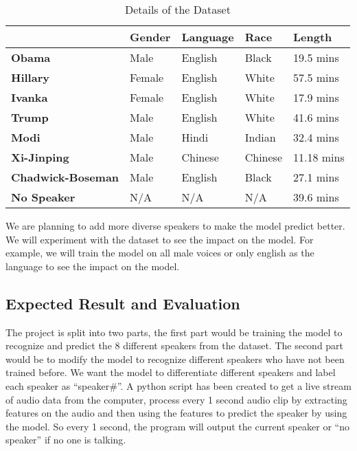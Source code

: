 \documentclass[10pt,twocolumn,letterpaper]{article}
\begin{document}
\begin{table}[h]
    \begin{tabular}{l|l|l|l|l|}
    \cline{2-5}
                                                    & \textbf{Gender} & \textbf{Language} & \textbf{Race} & \textbf{Length} \\ \hline
    \multicolumn{1}{|l|}{\textbf{Obama}}            & Male            & English           & Black         & 19.5 mins       \\ \hline
    \multicolumn{1}{|l|}{\textbf{Hillary}}          & Female          & English           & White         & 57.5 mins       \\ \hline
    \multicolumn{1}{|l|}{\textbf{Ivanka}}           & Female          & English           & White         & 17.9 mins       \\ \hline
    \multicolumn{1}{|l|}{\textbf{Trump}}            & Male            & English           & White         & 41.6 mins       \\ \hline
    \multicolumn{1}{|l|}{\textbf{Modi}}             & Male            & Hindi             & Indian        & 32.4 mins       \\ \hline
    \multicolumn{1}{|l|}{\textbf{Xi-Jinping}}       & Male            & Chinese           & Chinese       & 11.18 mins      \\ \hline
    \multicolumn{1}{|l|}{\textbf{Chadwick-Boseman}} & Male            & English           & Black         & 27.1 mins       \\ \hline
    \multicolumn{1}{|l|}{\textbf{No Speaker}}       & N/A             & N/A               & N/A           & 39.6 mins       \\ \hline
    \end{tabular}
    \caption{Details of the Dataset}
    \label{Dataset}
\end{table}

We are planning to add more diverse speakers to make the model predict better. We will experiment with the dataset to see the impact on the model. For example, we will train the model on all male voices or only english as the language to see the impact on the model. 

\subsection{Expected Result and Evaluation}

The project is split into two parts, the first part would be training the model to recognize and predict the 8 different speakers from the dataset. The second part would be to modify the model to recognize different speakers who have not been trained before.  We want the model to differentiate different speakers and label each speaker as “speaker\#”. A python script has been created to get a live stream of audio data from the computer, process every 1 second audio clip by extracting features on the audio and then using the features to predict the speaker by using the model. So every 1 second, the program will output the current speaker or “no speaker” if no one is talking.   
\end{document}
